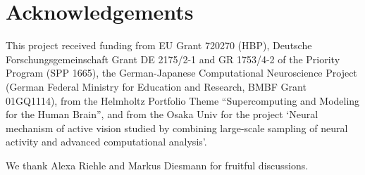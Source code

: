 \documentclass[10pt,a4paper,onecolumn]{article}
\begin{document}
\section{Acknowledgements}\label{acknowledgements}

This project received funding from EU Grant 720270 (HBP), Deutsche
Forschungsgemeinschaft Grant DE 2175/2-1 and GR 1753/4-2 of the Priority
Program (SPP 1665), the German-Japanese Computational Neuroscience
Project (German Federal Ministry for Education and Research, BMBF Grant
01GQ1114), from the Helmholtz Portfolio Theme ``Supercomputing and
Modeling for the Human Brain'', and from the Osaka Univ for the project
`Neural mechanism of active vision studied by combining large-scale
sampling of neural activity and advanced computational analysis'.

We thank Alexa Riehle and Markus Diesmann for fruitful discussions.

{\sffamily \small
  \printbibliography[title=References]
}
\end{document}
